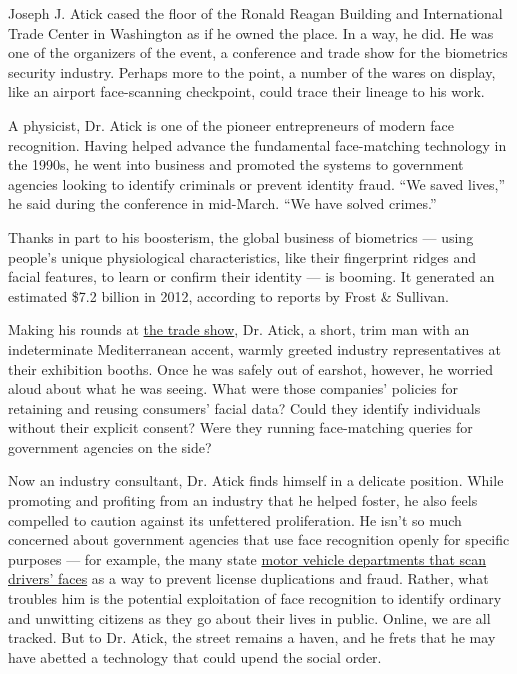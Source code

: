 Joseph J. Atick cased the floor of the Ronald Reagan Building and
International Trade Center in Washington as if he owned the place. In a
way, he did. He was one of the organizers of the event, a conference and
trade show for the biometrics security industry. Perhaps more to the
point, a number of the wares on display, like an airport face-scanning
checkpoint, could trace their lineage to his work.

A physicist, Dr. Atick is one of the pioneer entrepreneurs of modern
face recognition. Having helped advance the fundamental face-matching
technology in the 1990s, he went into business and promoted the systems
to government agencies looking to identify criminals or prevent identity
fraud. ``We saved lives,'' he said during the conference in mid-March.
``We have solved crimes.''

Thanks in part to his boosterism, the global business of biometrics ---
using people's unique physiological characteristics, like their
fingerprint ridges and facial features, to learn or confirm their
identity --- is booming. It generated an estimated \$7.2 billion in
2012, according to reports by Frost \& Sullivan.

Making his rounds at \href{http://www.connectidexpo.com/}{the trade
show}, Dr. Atick, a short, trim man with an indeterminate Mediterranean
accent, warmly greeted industry representatives at their exhibition
booths. Once he was safely out of earshot, however, he worried aloud
about what he was seeing. What were those companies' policies for
retaining and reusing consumers' facial data? Could they identify
individuals without their explicit consent? Were they running
face-matching queries for government agencies on the side?

Now an industry consultant, Dr. Atick finds himself in a delicate
position. While promoting and profiting from an industry that he helped
foster, he also feels compelled to caution against its unfettered
proliferation. He isn't so much concerned about government agencies that
use face recognition openly for specific purposes --- for example, the
many state
\href{http://www.oregon.gov/ODOT/DMV/pages/faqs/facial_recognition.aspx}{motor
vehicle departments that scan drivers' faces} as a way to prevent
license duplications and fraud. Rather, what troubles him is the
potential exploitation of face recognition to identify ordinary and
unwitting citizens as they go about their lives in public. Online, we
are all tracked. But to Dr. Atick, the street remains a haven, and he
frets that he may have abetted a technology that could upend the social
order.

